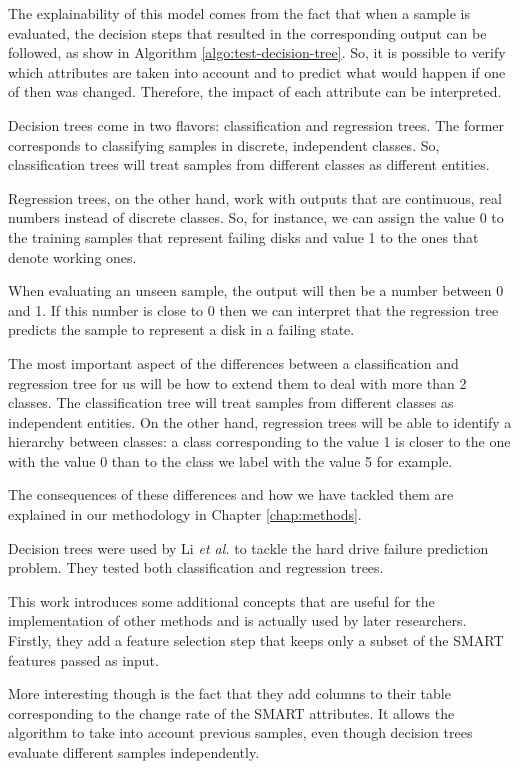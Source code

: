 The explainability of this model comes from the fact that when a sample is evaluated, the decision steps that resulted in the corresponding output can be followed, as show in Algorithm \ref{algo:test-decision-tree}.
So, it is possible to verify which attributes are taken into account and to predict what would happen if one of then was changed.
Therefore, the impact of each attribute can be interpreted.

Decision trees come in two flavors: classification and regression trees.
The former corresponds to classifying samples in discrete, independent classes.
So, classification trees will treat samples from different classes as different entities.

Regression trees, on the other hand, work with outputs that are continuous, real numbers instead of discrete classes.
So, for instance, we can assign the value 0 to the training samples that represent failing disks and value 1 to the ones that denote working ones.

When evaluating an unseen sample, the output will then be a number between 0 and 1.
If this number is close to 0 then we can interpret that the regression tree predicts the sample to represent a disk in a failing state. 

The most important aspect of the differences between a classification and regression tree for us will be how to extend them to deal with more than 2 classes.
The classification tree will treat samples from different classes as independent entities.
On the other hand, regression trees will be able to identify a hierarchy between classes: a class corresponding to the value 1 is closer to the one with the value 0 than to the class we label with the value 5 for example.

The consequences of these differences and how we have tackled them are explained in our methodology in Chapter \ref{chap:methods}.

Decision trees were used by Li \textit{et al.} \cite{Li14} to tackle the hard drive failure prediction problem.
They tested both classification and regression trees.

This work introduces some additional concepts that are useful for the implementation of other methods and is actually used by later researchers.
Firstly, they add a feature selection step that keeps only a subset of the SMART features passed as input.

More interesting though is the fact that they add columns to their table corresponding to the change rate of the SMART attributes.
It allows the algorithm to take into account previous samples, even though decision trees evaluate different samples independently.

